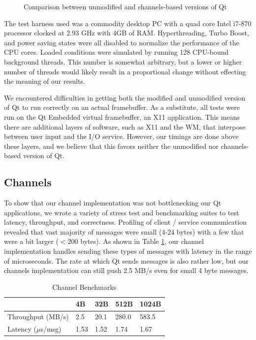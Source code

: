 \documentclass[letterpaper,twocolumn,11pt]{article}
\begin{document}
\begin{figure}[t]
\begin{center}
  \end{center}
  \caption{Comparison between unmodified and channels-based versions of Qt}
  \label{fig:benchmarks}
\end{figure}

The test harness used was a commodity desktop PC with a quad core Intel i7-870 processor clocked at 2.93 GHz with 4GB of RAM. Hyperthreading, Turbo Boost, and power saving states were all disabled to normalize the performance of the CPU cores. Loaded conditions were simulated by running 128 CPU-bound background threads. This number is somewhat arbitrary, but a lower or higher number of threads would likely result in a proportional change without effecting the meaning of our results.

We encountered difficulties in getting both the modified and unmodified version of Qt to run correctly on an actual framebuffer. As a substitute, all tests were run on the Qt Embedded virtual framebuffer, an X11 application. This means there are additional layers of software, such as X11 and the WM, that interpose between user input and the I/O service. However, our timings are done above these layers, and we believe that this favors neither the unmodified nor channels-based version of Qt.

\subsection{Channels}

To show that our channel implementation was not bottlenecking our Qt applications, we wrote a variety of stress test and benchmarking suites to test latency, throughput, and correctness. Profiling of client / service communication revealed that vast majority of messages were small (4-24 bytes) with a few that were a bit larger ($<$200 bytes). As shown in Table \ref{tab:channel}, our channel implementation handles sending these types of messages with latency in the range of microseconds. The rate at which Qt sends messages is also rather low, but our channels implementation can still push 2.5 MB/s even for small 4 byte messages.

\begin{table}[tp]
\caption{Channel Benchmarks}
\centering
\label{tab:channel}
\begin{tabular}{| l | l | l | l | l |}
\hline
						&4B 	& 32B	&512B	&1024B\\ \hline
Throughput (MB/s)		&2.5	&20.1	&280.0	&583.5\\
Latency ($\mu$s/msg)	&1.53	&1.52	&1.74	&1.67\\
\hline
\end{tabular}
\end{table}
\end{document}
